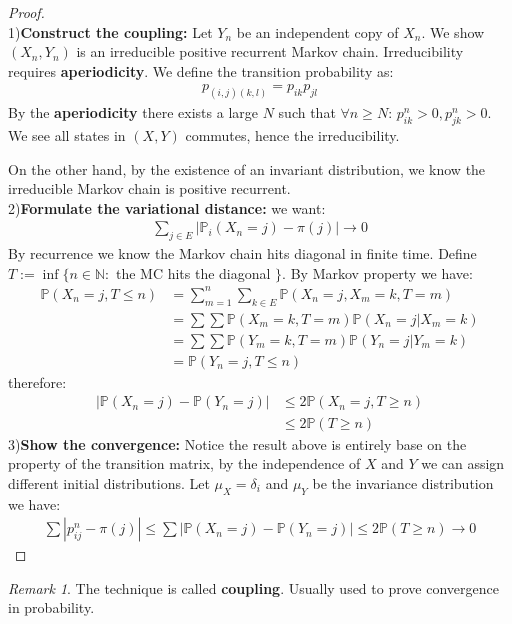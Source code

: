 \documentclass[a4paper,11pt]{book}
\theoremstyle{definition}
\theoremstyle{remark}
\newtheorem*{remark}{Remark}
\begin{document}
\begin{proof}
\quad\\
1)\textbf{Construct the coupling:} Let $Y_n$ be an independent copy of $X_n$. We show $(X_n, Y_n)$ is an irreducible positive recurrent Markov chain. Irreducibility requires \textbf{aperiodicity}. We define the transition probability as:
\begin{align*}
	p_{(i,j)(k,l)} = p_{ik} p_{jl}
\end{align*}
By the \textbf{aperiodicity} there exists a large $N$ such that $\forall n \ge N$: $p_{ik}^n > 0, p_{jk}^n >0$. We see all states in $(X, Y)$ commutes, hence the irreducibility. \par 
On the other hand, by the existence of an invariant distribution, we know the irreducible Markov chain is positive recurrent.\\
2)\textbf{Formulate the variational distance:} we want:
\begin{align*}
	\sum_{j \in E} |\mathbb{P}_i(X_n = j) - \pi(j)| \rightarrow 0
\end{align*}
By recurrence we know the Markov chain hits diagonal in finite time. Define $T:= \inf\{n\in \mathbb{N}:$ the MC hits the diagonal $\}$. By Markov property we have:
\begin{align*}
	\mathbb{P}(X_n = j, T \le n) &= \sum_{m = 1}^n \sum_{k \in E} \mathbb{P}(X_n = j, X_m = k, T = m)\\
	&= \sum\sum \mathbb{P}(X_m = k, T = m)\mathbb{P}(X_n = j|X_m = k)\\
	&= \sum\sum \mathbb{P}(Y_m = k, T = m)\mathbb{P}(Y_n = j|Y_m = k)\\
	&= \mathbb{P}(Y_n = j, T \le n)
\end{align*}
therefore:
\begin{align*}
	|\mathbb{P}(X_n = j) - \mathbb{P}(Y_n = j)| &\le 2 \mathbb{P}(X_n = j, T\ge n) \\
	 &\le 2 \mathbb{P}(T \ge n)
\end{align*}
3)\textbf{Show the convergence: }Notice the result above is entirely base on the property of the transition matrix, by the independence of $X$ and $Y$ we can assign different initial distributions. Let $\mu_X = \delta_i $ and $\mu_Y$ be the invariance distribution we have:
\begin{align*}
	\sum|p_{ij}^n - \pi(j)| \le \sum |\mathbb{P}(X_n = j) - \mathbb{P}(Y_n = j)| \le 2\mathbb{P}(T \ge n) \rightarrow 0
\end{align*}
\end{proof}
\begin{remark}
The technique is called \textbf{coupling}. Usually used to prove convergence in probability.	
\end{remark}
\end{document}
